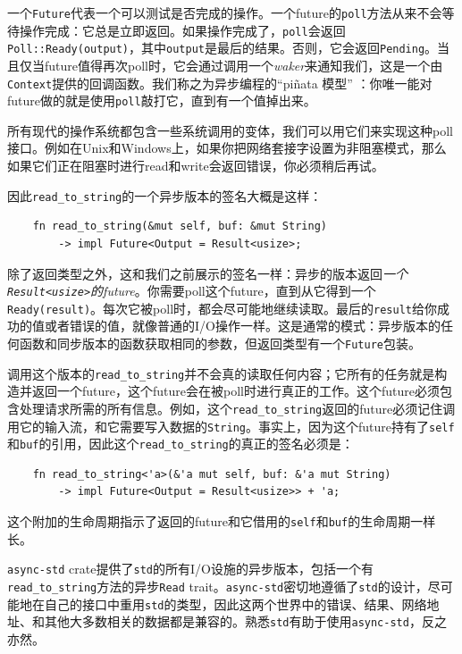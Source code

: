 一个\texttt{Future}代表一个可以测试是否完成的操作。一个future的\texttt{poll}方法从来不会等待操作完成：它总是立即返回。如果操作完成了，\texttt{poll}会返回\texttt{Poll::Ready(output)}，其中\texttt{output}是最后的结果。否则，它会返回\texttt{Pending}。当且仅当future值得再次poll时，它会通过调用一个\emph{waker}来通知我们，这是一个由\texttt{Context}提供的回调函数。我们称之为异步编程的“piñata 模型” ：你唯一能对future做的就是使用\texttt{poll}敲打它，直到有一个值掉出来。

所有现代的操作系统都包含一些系统调用的变体，我们可以用它们来实现这种poll接口。例如在Unix和Windows上，如果你把网络套接字设置为非阻塞模式，那么如果它们正在阻塞时进行read和write会返回错误，你必须稍后再试。

因此\texttt{read\_to\_string}的一个异步版本的签名大概是这样：
\begin{verbatim}
    fn read_to_string(&mut self, buf: &mut String)
        -> impl Future<Output = Result<usize>;
\end{verbatim}

除了返回类型之外，这和我们之前展示的签名一样：异步的版本返回\emph{一个\texttt{Result<usize>}的future}。你需要poll这个future，直到从它得到一个\texttt{Ready(result)}。每次它被poll时，都会尽可能地继续读取。最后的\texttt{result}给你成功的值或者错误的值，就像普通的I/O操作一样。这是通常的模式：异步版本的任何函数和同步版本的函数获取相同的参数，但返回类型有一个\texttt{Future}包装。

调用这个版本的\texttt{read\_to\_string}并不会真的读取任何内容；它所有的任务就是构造并返回一个future，这个future会在被poll时进行真正的工作。这个future必须包含处理请求所需的所有信息。例如，这个\texttt{read\_to\_string}返回的future必须记住调用它的输入流，和它需要写入数据的\texttt{String}。事实上，因为这个future持有了\texttt{self}和\texttt{buf}的引用，因此这个\texttt{read\_to\_string}的真正的签名必须是：
\begin{verbatim}
    fn read_to_string<'a>(&'a mut self, buf: &'a mut String)
        -> impl Future<Output = Result<usize>> + 'a;
\end{verbatim}

这个附加的生命周期指示了返回的future和它借用的\texttt{self}和\texttt{buf}的生命周期一样长。

\texttt{async-std} crate提供了\texttt{std}的所有I/O设施的异步版本，包括一个有\texttt{read\_to\_string}方法的异步\texttt{Read} trait。\texttt{async-std}密切地遵循了\texttt{std}的设计，尽可能地在自己的接口中重用\texttt{std}的类型，因此这两个世界中的错误、结果、网络地址、和其他大多数相关的数据都是兼容的。熟悉\texttt{std}有助于使用\texttt{async-std}，反之亦然。

